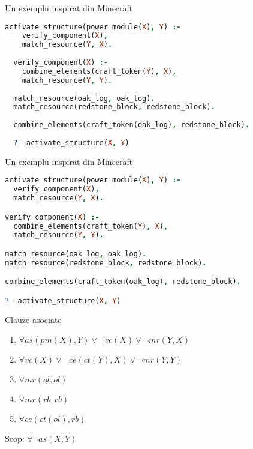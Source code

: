 \documentclass[xcolor=pdftex,romanian,colorlinks]{beamer}
\begin{document}
\begin{frame}[fragile]{Un exemplu inspirat din Minecraft}

  \begin{lstlisting}[language=Prolog]
  activate_structure(power_module(X), Y) :-
    verify_component(X),
    match_resource(Y, X).
  
  verify_component(X) :-
    combine_elements(craft_token(Y), X),
    match_resource(Y, Y).
  
  match_resource(oak_log, oak_log).
  match_resource(redstone_block, redstone_block).
  
  combine_elements(craft_token(oak_log), redstone_block).
  
  ?- activate_structure(X, Y)
  \end{lstlisting}
\end{frame}
  
\begin{frame}[fragile]{Un exemplu inspirat din Minecraft}

\begin{lstlisting}[language=Prolog, basicstyle=\tiny]
activate_structure(power_module(X), Y) :-
  verify_component(X),
  match_resource(Y, X).

verify_component(X) :-
  combine_elements(craft_token(Y), X),
  match_resource(Y, Y).

match_resource(oak_log, oak_log).
match_resource(redstone_block, redstone_block).

combine_elements(craft_token(oak_log), redstone_block).

?- activate_structure(X, Y)
\end{lstlisting}

\begin{block}{Clauze asociate}
\begin{enumerate}
  \item $\forall as(pm(X), Y) \vee \neg vc(X) \vee \neg mr(Y, X)$
  \item $\forall vc(X) \vee \neg ce(ct(Y), X) \vee \neg mr(Y, Y)$
  \item $\forall mr(ol, ol)$
  \item $\forall mr(rb, rb)$
  \item $\forall ce(ct(ol), rb)$
\end{enumerate}
Scop: $\forall \neg as(X, Y)$
\end{block}

\end{frame}
\end{document}
